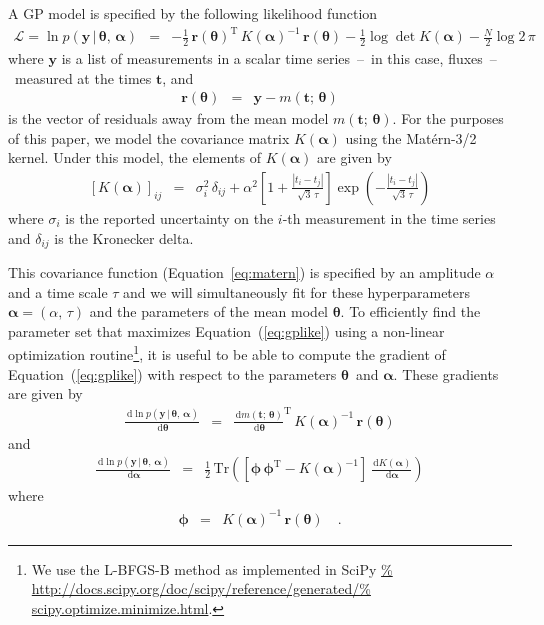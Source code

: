 \documentclass[manuscript, letterpaper]{aastex6}
\renewcommand{\eqref}[1]{\ref{eq:#1}}
\newcommand{\Eq}[1]{Equation~(\eqref{#1})}
\newcommand{\eq}[1]{\Eq{#1}}
\newcommand{\eqalt}[1]{Equation~\eqref{#1}}
\newcommand{\eqlabel}[1]{\label{eq:#1}}
\newcommand{\T}{\ensuremath{\mathrm{T}}}
\newcommand{\dd}{\ensuremath{\,\mathrm{d}}}
\newcommand{\bvec}[1]{{\ensuremath{\boldsymbol{#1}}}}
\newcommand{\meanpars}{{\ensuremath{\bvec{\theta}}}}
\newcommand{\kernpars}{{\ensuremath{\bvec{\alpha}}}}
\begin{document}
A GP model is specified by the following likelihood function
\begin{eqnarray}\eqlabel{gplike}
\mathcal{L} = \ln p(\bvec{y}\,|\,\meanpars,\,\kernpars) &=&
- \frac{1}{2}\,\bvec{r}(\meanpars)^\T\,K(\kernpars)^{-1}\,
    \bvec{r}(\meanpars)
- \frac{1}{2}\log\det K(\kernpars) - \frac{N}{2} \log{2\,\pi}
\end{eqnarray}
where \bvec{y} is a list of measurements in a scalar time series~--~in this
case, fluxes~--~measured at the times \bvec{t}, and
\begin{eqnarray}
\bvec{r}(\meanpars) &=& \bvec{y} - m(\bvec{t};\,\meanpars)
\end{eqnarray}
is the vector of residuals away from the mean model $m(\bvec{t};\,\meanpars)$.
For the purposes of this paper, we model the covariance matrix $K(\kernpars)$
using the Mat\'ern-3/2 kernel.
Under this model, the elements of $K(\kernpars)$ are given by
\begin{eqnarray}\eqlabel{matern}
\left[ K(\kernpars) \right]_{ij} &=& \sigma_i^2\,\delta_{ij}
    + \alpha^2 \left[ 1+\frac{|t_i - t_j|}{\sqrt{3}\,\tau} \right]
      \exp \left(-\frac{|t_i - t_j|}{\sqrt{3}\,\tau}\right)
\end{eqnarray}
where $\sigma_i$ is the reported uncertainty on the $i$-th measurement in the
time series and $\delta_{ij}$ is the Kronecker delta.

This covariance function (\eqalt{matern}) is specified by an amplitude
$\alpha$ and a time scale $\tau$ and we will simultaneously fit for these
hyperparameters $\kernpars=(\alpha,\,\tau)$ and the parameters of the mean
model \meanpars.
To efficiently find the parameter set that maximizes \eq{gplike} using a
non-linear optimization routine\footnote{We use the L-BFGS-B method as
implemented in SciPy \url{%
http://docs.scipy.org/doc/scipy/reference/generated/%
scipy.optimize.minimize.html}.},
it is useful to be able to compute the gradient of \eq{gplike} with respect to
the parameters \meanpars\ and \kernpars.
These gradients are given by
\begin{eqnarray}\eqlabel{gpmeangrad}
\frac{\dd\ln p(\bvec{y}\,|\,\meanpars,\,\kernpars)}{\dd \meanpars} &=&
\frac{\dd m(\bvec{t};\,\meanpars)}{\dd\meanpars}^\T \, K(\kernpars)^{-1} \,
    \bvec{r}(\meanpars)
\end{eqnarray}
and
\begin{eqnarray}
\frac{\dd\ln p(\bvec{y}\,|\,\meanpars,\,\kernpars)}{\dd \kernpars} &=&
\frac{1}{2}\,\mathrm{Tr}\left(
    \left[ \bvec{\phi}\,\bvec{\phi}^\T - K(\kernpars)^{-1} \right]
    \,\frac{\dd K(\kernpars)}{\dd\kernpars}
\right)
\end{eqnarray}
where
\begin{eqnarray}
\bvec{\phi} &=& K(\kernpars)^{-1}\,\bvec{r}(\meanpars) \quad.
\end{eqnarray}


\end{document}
